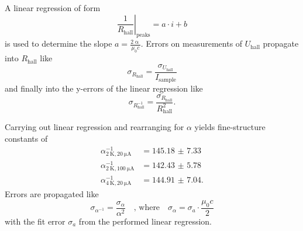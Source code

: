 A linear regression of form
\begin{equation*}
	\left. \frac{1}{R_\text{hall}}\right\rvert_\text{peaks} = a\cdot i + b
\end{equation*}
is used to determine the slope $a=\frac{2\upalpha}{\mu_0 c}$.
Errors on measurements of $U_\text{hall}$ propagate into $R_\text{hall}$ like
\begin{equation*}
	\sigma_{R_\text{hall}} = \frac{\sigma_{U_\text{hall}}}{I_\text{sample}}
\end{equation*}
and finally into the y-errors of the linear regression like
\begin{equation*}
	\sigma_{R^{-1}_\text{hall}} = \frac{\sigma_{R_\text{hall}}}{R_\text{hall}^2}.
\end{equation*}

Carrying out linear regression and rearranging for $\alpha$ yields fine-structure constants of
\begin{align*}
	\alpha^{-1}_{\SI{2}{\kelvin},\SI{20}{\micro\ampere}} &= \num{145.18(733)} \\
	\alpha^{-1}_{\SI{2}{\kelvin},\SI{100}{\micro\ampere}} &= \num{142.43(578)} \\
	\alpha^{-1}_{\SI{4}{\kelvin},\SI{20}{\micro\ampere}} &= \num{144.91(704)}.
\end{align*}
Errors are propagated like
\begin{equation*}
	\sigma_{\alpha^{-1}} = \frac{\sigma_\alpha}{\alpha^2}\quad\text{, where}\quad\sigma_\alpha = \sigma_a\cdot\frac{\mu_0c}{2}
\end{equation*}
with the fit error $\sigma_a$ from the performed linear regression.
